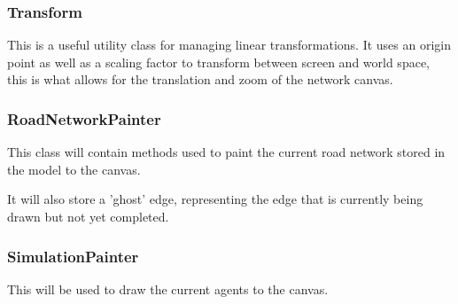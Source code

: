         \subsubsection{Transform}

            This is a useful utility class for managing linear transformations. It uses an origin point as well as a scaling factor to transform between screen and world space, this is what allows for the translation and zoom of the network canvas.


        \subsubsection{RoadNetworkPainter}

            This class will contain methods used to paint the current road network stored in the model to the canvas.

            It will also store a 'ghost' edge, representing the edge that is currently being drawn but not yet completed.


        \subsubsection{SimulationPainter}

            This will be used to draw the current agents to the canvas.

